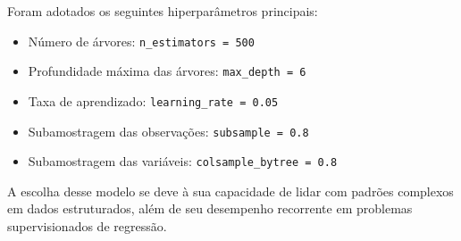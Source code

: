 Foram adotados os seguintes hiperparâmetros principais:

\begin{itemize}
    \item Número de árvores: \texttt{n\_estimators = 500}
    \item Profundidade máxima das árvores: \texttt{max\_depth = 6}
    \item Taxa de aprendizado: \texttt{learning\_rate = 0.05}
    \item Subamostragem das observações: \texttt{subsample = 0.8}
    \item Subamostragem das variáveis: \texttt{colsample\_bytree = 0.8}
\end{itemize}

A escolha desse modelo se deve à sua capacidade de lidar com padrões complexos em dados estruturados, além de seu desempenho recorrente em problemas 
supervisionados de regressão.

